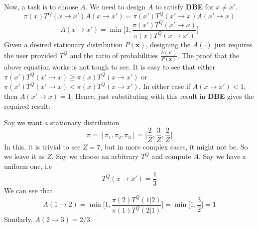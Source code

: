 Now, a task is to choose $A$. We need to design $A$ to satisfy \textbf{DBE} for $x \neq x'$.
\[\pi(x)T^Q(x\to x') A(x\to x') = \pi(x') T^Q (x' \to x) A(x' \to x)\]
\begin{equation}
	A(x \to x') = \min\bigg[1, \dfrac{\pi(x')T^Q(x' \to x)}{\pi(x) T^Q(x\to x')}\bigg]
\end{equation}
Given a desired stationary distribution $P(\mathbf x)$, designing the $A(\cdot)$ just requires the user provided $T^Q$ and the ratio of probabilities $\frac{P(\mathbf x')}{P(\mathbf x)}$. The proof that the above equation works is not tough to see. It is easy to see that either
$\pi(x')T^Q(x' \to x) \geq \pi(x) T^Q(x\to x')$ or $\pi(x')T^Q(x' \to x) < \pi(x) T^Q(x\to x')$. In either case if $A(x \to x') < 1$, then $A(x' \to x) = 1$. Hence, just substituting with this result in \textbf{DBE} gives the required result.

\begin{exmp}
Say we want a stationary distribution
\[\pi = [\pi_1, \pi_2, \pi_3] = \bigg[\dfrac{2}{Z}, \dfrac{3}{Z}, \dfrac{2}{Z} \bigg]\]
In this, it is trivial to see $Z = 7$, but in more complex cases, it might not be. So we leave it as $Z$. Say we choose an arbitrary $T^Q$ and compute $A$. Say we have a uniform one, i.e
\[T^Q (x \to x') = \dfrac{1}{3}\]
We can see that \[A(1 \to 2) = \min\bigg[1, \dfrac{\pi(2) T^Q (1|2)}{\pi(1) T^Q (2|1)} \bigg] = \min\bigg[1, \dfrac{3}{2}\bigg] = 1\]
Similarly, $A(2 \to 3) = 2/3$.
\end{exmp}
